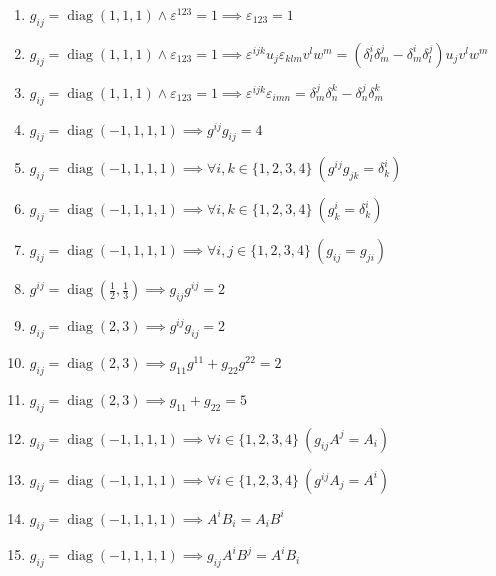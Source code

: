 \documentclass[11pt,a4paper]{article}
\begin{document}
\begin{enumerate}
\item $\displaystyle g_{ij} = \operatorname{diag}(1, 1, 1) \land \varepsilon^{123} = 1 \implies \varepsilon_{123} = 1$
\item $\displaystyle g_{ij} = \operatorname{diag}(1, 1, 1) \land \varepsilon_{123} = 1 \implies \varepsilon^{ijk} u_{j}\varepsilon_{klm} v^{l} w^{m} = \left( \delta^{i}_{l}\delta^{j}_{m} - \delta^{i}_{m}\delta^{j}_{l} \right) u_{j} v^{l} w^{m}$
\item $\displaystyle g_{ij} = \operatorname{diag}(1, 1, 1) \land \varepsilon_{123} = 1 \implies \varepsilon^{ijk}\varepsilon_{imn} = \delta^{j}_{m}\delta^{k}_{n} - \delta^{j}_{n}\delta^{k}_{m}$
\item $\displaystyle g_{ij} = \operatorname{diag}(-1, 1, 1, 1) \implies g^{ij} g_{ij} = 4$
\item $\displaystyle g_{ij} = \operatorname{diag}(-1, 1, 1, 1) \implies \forall i, k \in \{1, 2, 3, 4\}\ \left( g^{ij} g_{jk} = \delta^{i}_{k} \right)$
\item $\displaystyle g_{ij} = \operatorname{diag}(-1, 1, 1, 1) \implies \forall i, k \in \{1, 2, 3, 4\}\ \left( g^{i}_{k} = \delta^{i}_{k} \right)$
\item $\displaystyle g_{ij} = \operatorname{diag}(-1, 1, 1, 1) \implies \forall i, j \in \{1, 2, 3, 4\}\ \left( g_{ij} = g_{ji} \right)$
\item $\displaystyle g^{ij} = \operatorname{diag}(\frac{1}{2}, \frac{1}{3}) \implies g_{ij} g^{ij} = 2$
\item $\displaystyle g_{ij} = \operatorname{diag}(2, 3) \implies g^{ij} g_{ij} = 2$
\item $\displaystyle g_{ij} = \operatorname{diag}(2, 3) \implies g_{11} g^{11} + g_{22} g^{22} = 2$
\item $\displaystyle g_{ij} = \operatorname{diag}(2, 3) \implies g_{11} + g_{22} = 5$
\item $\displaystyle g_{ij} = \operatorname{diag}(-1, 1, 1, 1) \implies \forall i \in \{1, 2, 3, 4\}\ \left( g_{ij} A^{j} = A_{i} \right)$
\item $\displaystyle g_{ij} = \operatorname{diag}(-1, 1, 1, 1) \implies \forall i \in \{1, 2, 3, 4\}\ \left( g^{ij} A_{j} = A^{i} \right)$
\item $\displaystyle g_{ij} = \operatorname{diag}(-1, 1, 1, 1) \implies A^{i} B_{i} = A_{i} B^{i}$
\item $\displaystyle g_{ij} = \operatorname{diag}(-1, 1, 1, 1) \implies g_{ij} A^{i} B^{j} = A^{i} B_{i}$

\end{enumerate}
\end{document}
